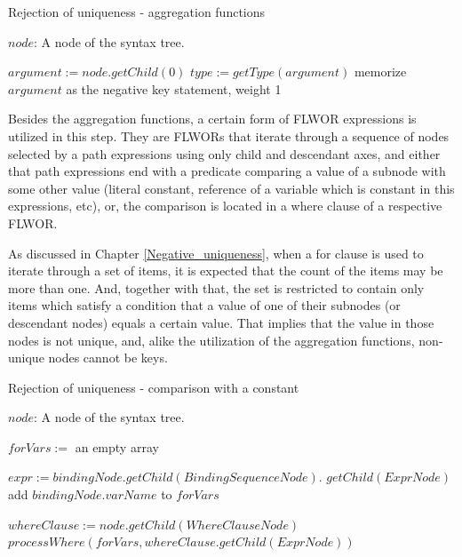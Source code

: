 \begin{algorithm}
\caption{Rejection of uniqueness - aggregation functions}
\label{ALG_rejection_of_uniqueness_aggregation_functions}
\begin{algorithmic}[1]
\REQUIRE $node$: A node of the syntax tree.

        \STATE $argument := node.getChild(0)$
        \STATE $type := getType(argument)$
            \STATE memorize $argument$ as the negative key statement, weight 1
        \ENDIF
    \ENDIF
\ENDIF
\end{algorithmic}
\end{algorithm}

Besides the aggregation functions, a certain form of FLWOR expressions is utilized in this step. They are FLWORs that iterate through a sequence of nodes selected by a path expressions using only child and descendant axes, and either that path expressions end with a predicate comparing a value of a subnode with some other value (literal constant, reference of a variable which is constant in this expressions, etc), or, the comparison is located in a where clause of a respective FLWOR.

As discussed in Chapter \ref{Negative_uniqueness}, when a for clause is used to iterate through a set of items, it is expected that the count of the items may be more than one. And, together with that, the set is restricted to contain only items which satisfy a condition that a value of one of their subnodes (or descendant nodes) equals a certain value. That implies that the value in those nodes is not unique, and, alike the utilization of the aggregation functions, non-unique nodes cannot be keys.

\begin{algorithm}
\caption{Rejection of uniqueness - comparison with a constant}
\label{ALG_rejection_of_uniqueness_comparison_with_a_constant}
\begin{algorithmic}[1]
\REQUIRE $node$: A node of the syntax tree.

	\STATE $forVars :=$ an empty array

            \STATE $expr := bindingNode.getChild(BindingSequenceNode).$ $getChild(ExprNode)$
                \STATE add $bindingNode.varName$ to $forVars$
            \ENDIF
        \ENDIF
    \ENDFOR
    
    \STATE $whereClause := node.getChild(WhereClauseNode)$
    	\STATE $processWhere(forVars, whereClause.getChild(ExprNode))$
	\ENDIF
\ENDIF
\end{algorithmic}
\end{algorithm}

